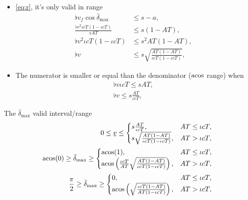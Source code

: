 \begin{itemize}
\item
\eqref{eq:r}, it's only valid in range
\begin{align*}
\flat{v}_f \cos\bar{\delta}_{\max} &\le s - a,\\
\frac{\flat{v}^2 \iota cT(1 - \iota cT)}{sAT} &\le s(1 - AT),\\
\flat{v}^2 \iota cT(1 - \iota cT) &\le s^2 AT(1 - AT),\\
\flat{v} &\le s \sqrt{\frac{AT(1 - AT)}{\iota cT(1 - \iota cT)}},
\end{align*}

\item
The numerator is smaller or equal than the denominator ($\operatorname{acos}$ range) when
\begin{align*}
\flat{v} \iota cT \le sAT,\\
\flat{v} \le s \frac{AT}{\iota cT},
\end{align*}
\end{itemize}

The $\bar{\delta}_{\max}$ valid interval/range
\begin{align*}
0 \le \flat{v} \le
\begin{cases}
s \frac{AT}{\iota cT}, & AT \le \iota cT,\\
s \sqrt{\frac{AT(1 - AT)}{\iota cT(1 - \iota cT)}}, &AT > \iota cT,
\end{cases}\\
\acos(0) \ge \bar{\delta}_{\max} \ge
\begin{cases}
\acos(1), & AT \le \iota cT,\\
\acos\left( \frac{\iota cT}{AT} \sqrt{\frac{AT(1 - AT)}{\iota cT(1 - \iota cT)}} \right), &AT > \iota cT,
\end{cases}\\
\frac{\pi}{2} \ge \bar{\delta}_{\max} \ge
\begin{cases}
0, & AT \le \iota cT,\\
\acos\left( \sqrt{\frac{\iota cT(1 - AT)}{AT(1 - \iota cT)}} \right), &AT > \iota cT,
\end{cases}
\end{align*}


